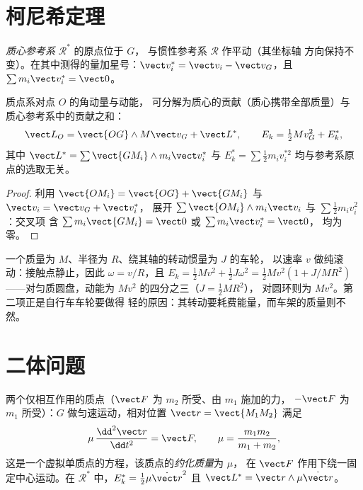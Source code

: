 \section{柯尼希定理}

\begin{definition}[质心参考系]\label{def:b1:systems-of-points:barycentric}
\emph{质心参考系} $\mathcal R^*$ 的原点位于 $G$，
与惯性参考系 $\mathcal R$ 作平动（其坐标轴
方向保持不变）。在其中测得的量加星号：$\vect v_i^*
= \vect v_i - \vect v_G$，且 $\sum m_i\vect v_i^* = \vect 0$。
\end{definition}

\begin{theorem}[柯尼希定理]\label{thm:b1:systems-of-points:koenig}
质点系对点 $O$ 的角动量与动能，
可分解为质心的贡献（质心携带全部质量）与
质心参考系中的贡献之和：
\[
\vect L_O = \vect{OG}\wedge M\vect v_G + \vect L^*, \qquad
E_k = \tfrac12 Mv_G^2 + E_k^*,
\]
其中 $\vect L^* = \sum\vect{GM_i}\wedge m_i\vect v_i^*$ 与 $E_k^* = \sum\tfrac12
m_iv_i^{*2}$ 均与参考系原点的选取无关。
\end{theorem}

\begin{proof}
利用 $\vect{OM_i} = \vect{OG} + \vect{GM_i}$ 与 $\vect v_i = \vect v_G + \vect v_i^*$，
展开 $\sum\vect{OM_i}\wedge m_i\vect v_i$ 与 $\sum\tfrac12 m_iv_i^2$：交叉项
含 $\sum m_i\vect{GM_i} = \vect 0$ 或 $\sum m_i\vect v_i^* = \vect 0$，
均为零。
\end{proof}

\begin{example}[滚动的车轮]\label{ex:b1:systems-of-points:rolling}
一个质量为 $M$、半径为 $R$、绕其轴的转动惯量为 $J$ 的车轮，
以速率 $v$ 做纯滚动：接触点静止，因此
$\omega = v/R$，且 $E_k = \tfrac12 Mv^2 + \tfrac12 J\omega^2 = \tfrac12 Mv^2(1 +
J/MR^2)$——对匀质圆盘，动能为 $Mv^2$ 的四分之三（$J = \tfrac12 MR^2$），
对圆环则为 $Mv^2$。第二项正是自行车车轮要做得
轻的原因：其转动要耗费能量，而车架的质量则不然。
\end{example}

\section{二体问题}

\begin{proposition}[约化质量]\label{prop:b1:systems-of-points:twobody}
两个仅相互作用的质点（$\vect F$ 为 $m_2$ 所受、由 $m_1$ 施加的力，
$-\vect F$ 为 $m_1$ 所受）：$G$ 做匀速运动，相对位置
$\vect r = \vect{M_1M_2}$ 满足
\[
\mu\,\frac{\dd^2\vect r}{\dd t^2} = \vect F, \qquad \mu = \frac{m_1m_2}{m_1 + m_2},
\]
这是一个虚拟单质点的方程，该质点的\emph{约化质量}为 $\mu$，
在 $\vect F$ 作用下绕一固定中心运动。在 $\mathcal R^*$ 中，$E_k^* =
\tfrac12\mu\dot{\vect r}^2$ 且 $\vect L^* = \vect r\wedge\mu\dot{\vect r}$。
\end{proposition}

